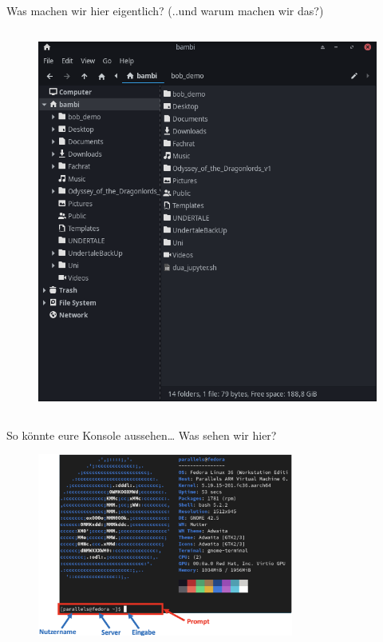 \documentclass[t, xcolor=dvipsnames]{beamer}
\begin{document}
\begin{frame}{Was machen wir hier eigentlich?}{ (..und warum machen wir das?) }
\begin{columns}
    \begin{column}{0.5\textwidth}
    \begin{figure}
        \centering
        \includegraphics[width=1.0\textwidth]{graphics/klicki-bunti}
    \end{figure}
    \end{column}
    
\end{columns}
  
\end{frame}



\begin{frame}{So könnte eure Konsole aussehen\dots}
Was sehen wir hier?

\begin{figure}
    \centering
    \includegraphics[width=0.75\textwidth]{graphics/prompt}
\end{figure}

\end{frame}
\end{document}
